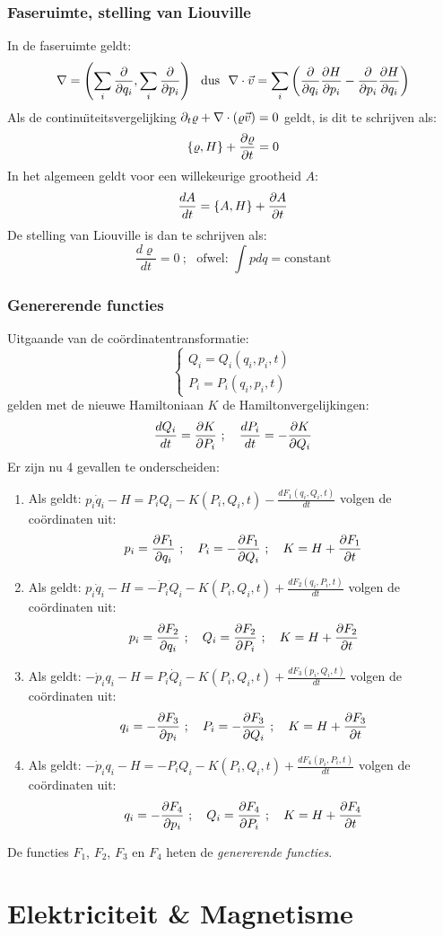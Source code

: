 \documentclass[twoside]{report}
\begin{document}
\subsection{Faseruimte, stelling van Liouville}
In de faseruimte geldt:
\[
\nabla=\left(\sum_i\frac{\partial }{\partial q_i},\sum_i\frac{\partial }{\partial p_i}\right)\mbox{~~dus~~}
\nabla\cdot\vec{v}=\sum_i\left(\frac{\partial }{\partial q_i}\frac{\partial H}{\partial p_i}-\frac{\partial }{\partial p_i}\frac{\partial H}{\partial q_i}\right)
\]
Als de continu\"{\i}teitsvergelijking $\partial_t\varrho+\nabla\cdot(\varrho\vec{v})=0$ geldt,
is dit te schrijven als:
\[
\{\varrho,H\}+\frac{\partial \varrho}{\partial t}=0
\]
In het algemeen geldt voor een willekeurige grootheid $A$:
\[
\frac{dA}{dt}=\{A,H\}+\frac{\partial A}{\partial t}
\]
De stelling van Liouville is dan te schrijven als:
\[
\frac{d\varrho}{dt}=0~;~~~\mbox{ofwel:~}\int pdq=\mbox{constant}
\]
\subsection{Genererende functies}
Uitgaande van de co\"ordinatentransformatie:
\[
\left\{\begin{array}{l}
Q_i=Q_i(q_i,p_i,t)\\
P_i=P_i(q_i,p_i,t)
\end{array}\right.
\]
gelden met de nieuwe Hamiltoniaan $K$ de Hamiltonvergelijkingen:
\[
\frac{dQ_i}{dt}=\frac{\partial K}{\partial P_i}~;~~~\frac{dP_i}{dt}=-\frac{\partial K}{\partial Q_i}
\]
Er zijn nu 4 gevallen te onderscheiden:
\begin{enumerate}
\item Als geldt: $\displaystyle p_i\dot{q}_i-H=P_iQ_i-K(P_i,Q_i,t)-\frac{dF_1(q_i,Q_i,t)}{dt}$
volgen de co\"ordinaten uit:
\[
p_i=\frac{\partial F_1}{\partial q_i}~;~~~P_i=-\frac{\partial F_1}{\partial Q_i}~;~~~K=H+\frac{\partial F_1}{\partial t}
\]
\item Als geldt: $\displaystyle p_i\dot{q}_i-H=-\dot{P}_iQ_i-K(P_i,Q_i,t)+\frac{dF_2(q_i,P_i,t)}{dt}$
volgen de co\"ordinaten uit:
\[
p_i=\frac{\partial F_2}{\partial q_i}~;~~~Q_i=\frac{\partial F_2}{\partial P_i}~;~~~K=H+\frac{\partial F_2}{\partial t}
\]
\item Als geldt: $\displaystyle-\dot{p}_iq_i-H=P_i\dot{Q}_i-K(P_i,Q_i,t)+\frac{dF_3(p_i,Q_i,t)}{dt}$
volgen de co\"ordinaten uit:
\[
q_i=-\frac{\partial F_3}{\partial p_i}~;~~~P_i=-\frac{\partial F_3}{\partial Q_i}~;~~~K=H+\frac{\partial F_3}{\partial t}
\]
\item Als geldt: $\displaystyle-\dot{p}_iq_i-H=-P_iQ_i-K(P_i,Q_i,t)+\frac{dF_4(p_i,P_i,t)}{dt}$
volgen de co\"ordinaten uit:
\[
q_i=-\frac{\partial F_4}{\partial p_i}~;~~~Q_i=\frac{\partial F_4}{\partial P_i}~;~~~K=H+\frac{\partial F_4}{\partial t}
\]
\end{enumerate}
De functies $F_1$, $F_2$, $F_3$ en $F_4$ heten de {\it genererende functies}.

\chapter{Elektriciteit \& Magnetisme}
\end{document}

